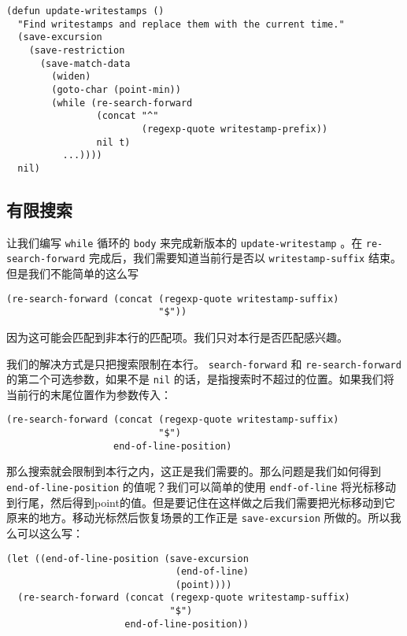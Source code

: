 \begin{verbatim}
(defun update-writestamps ()
  "Find writestamps and replace them with the current time."
  (save-excursion
    (save-restriction
      (save-match-data
        (widen)
        (goto-char (point-min))
        (while (re-search-forward
                (concat "^"
                        (regexp-quote writestamp-prefix))
                nil t)
          ...))))
  nil)
\end{verbatim}

\subsection{有限搜索}
\label{section:04-Limited-Searching}

让我们编写 \texttt{while} 循环的 \texttt{body} 来完成新版本的 \texttt{update-writestamp} 。在 \texttt{re-search-forward} 完成后，我们需要知道当前行是否以 \texttt{writestamp-suffix} 结束。但是我们不能简单的这么写

\begin{verbatim}
(re-search-forward (concat (regexp-quote writestamp-suffix)
                           "$"))
\end{verbatim}

因为这可能会匹配到非本行的匹配项。我们只对本行是否匹配感兴趣。

我们的解决方式是只把搜索限制在本行。 \texttt{search-forward} 和 \texttt{re-search-forward} 的第二个可选参数，如果不是 \texttt{nil} 的话，是指搜索时不超过的位置。如果我们将当前行的末尾位置作为参数传入：

\begin{verbatim}
(re-search-forward (concat (regexp-quote writestamp-suffix)
                           "$")
                   end-of-line-position)
\end{verbatim}

那么搜索就会限制到本行之内，这正是我们需要的。那么问题是我们如何得到 \texttt{end-of-line-position} 的值呢？我们可以简单的使用 \texttt{endf-of-line} 将光标移动到行尾，然后得到point的值。但是要记住在这样做之后我们需要把光标移动到它原来的地方。移动光标然后恢复场景的工作正是 \texttt{save-excursion} 所做的。所以我么可以这么写：

\begin{verbatim}
(let ((end-of-line-position (save-excursion
                              (end-of-line)
                              (point))))
  (re-search-forward (concat (regexp-quote writestamp-suffix)
                             "$")
                     end-of-line-position))
\end{verbatim}

